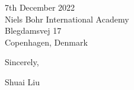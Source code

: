 \documentclass[11pt,a4paper,sans]{letter} %
\begin{document}
\begin{letter}{7th December 2022 \\
Niels Bohr International Academy\\
Blegdamsvej 17\\ 
Copenhagen, Denmark}
         
Sincerely,

Shuai Liu




\end{letter}
\end{document}
